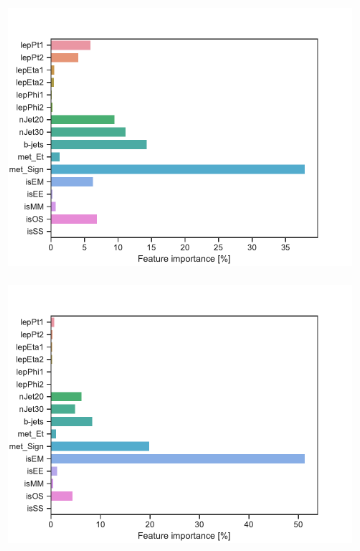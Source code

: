 \begin{figure}[H]
\begin{subfigure}[t!]{0.49\textwidth}
        \caption{}
        \label{fig:featSlepsnuLow}
    \end{subfigure}
    \begin{subfigure}[t!]{0.49\textwidth}
        \includegraphics[width = \textwidth]{Figures/WW/BDT/Low_level/High/featureImportance.pdf}
        \caption{}
        \label{fig:featWWLow}
    \end{subfigure}
    \begin{subfigure}[t!]{0.49\textwidth}
        \includegraphics[width = \textwidth]{Figures/Mono_Z/ML/BDT/Low_level/High/featureImportance.pdf}
        \caption{}
        \label{fig:featMonoZLow}
    \end{subfigure}
    \caption{}
    \label{fig:Non}
\end{figure}

